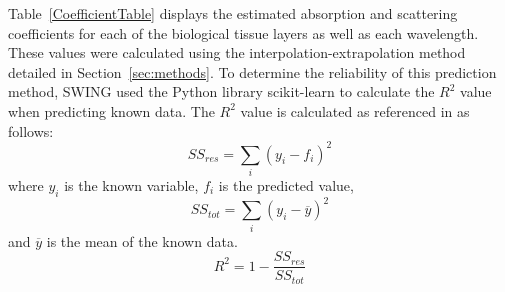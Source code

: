 \documentclass[journal,twoside,web]{ieeecolor}
\begin{document}
\begin{table}[h!]
    \centering
    \caption{Estimated Optical Coefficients}
    \label{CoefficientTable}
    \setlength{\tabcolsep}{3pt}
    \renewcommand{\arraystretch}{1.5}
    \label{tab1}
\end{table}

Table~\ref{CoefficientTable} displays the estimated absorption and scattering coefficients for each of the biological tissue 
layers as well as each wavelength. These values were calculated using the interpolation-extrapolation method detailed in 
Section~\ref{sec:methods}. To determine the reliability of this prediction method, SWING used the Python library scikit-learn\cite{b5} 
to calculate the $R^2$ value when predicting known data. The $R^2$ value is calculated as referenced in \cite{b5} as follows:
\begin{equation}
    SS_{res} = \sum_{i}{(y_i-f_i)^2}
\end{equation}
where $y_i$ is the known variable, $f_i$ is the predicted value,
\begin{equation}
    SS_{tot} = \sum_{i}{(y_i-\overline{y})^2}
\end{equation}
and $\overline{y}$ is the mean of the known data.
\begin{equation}
    R^2 = 1 - \frac{SS_{res}}{SS_{tot}}
\end{equation}
\end{document}
